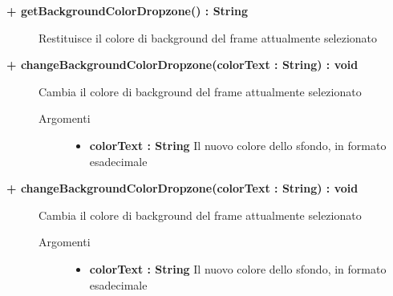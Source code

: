 \begin{description}
\begin{description}
	\end{description}
	
	\begin{description}
		\item[\textbf{\color{blue}+ getBackgroundColorDropzone() : String 	}] \hfill
		Restituisce il colore di background del frame attualmente selezionato

	\end{description}
	
	\begin{description}
		\item[\textbf{\color{blue}+ changeBackgroundColorDropzone(colorText : String) : void	 	}] \hfill
		Cambia il colore di background del frame attualmente selezionato
			
		\begin{description}
			\item[Argomenti] \hfill
				\begin{itemize}
				
					\item \textbf{colorText : String} \hfill
					Il nuovo colore dello sfondo, in formato esadecimale
				\end{itemize}
				
		\end{description}
	\end{description}
	
	\begin{description}
		\item[\textbf{\color{blue}+ changeBackgroundColorDropzone(colorText : String) : void	 	}] \hfill
		Cambia il colore di background del frame attualmente selezionato
			
		\begin{description}
			\item[Argomenti] \hfill
				\begin{itemize}
				
					\item \textbf{colorText : String} \hfill
					Il nuovo colore dello sfondo, in formato esadecimale
				\end{itemize}
				
		\end{description}
	\end{description}
	

\end{description}
